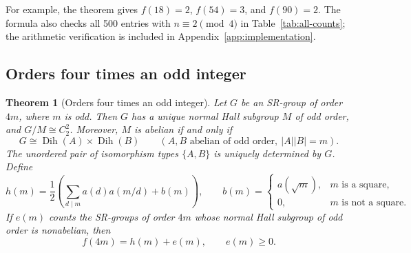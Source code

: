 \documentclass[11pt,a4paper]{amsart}
\newtheorem{thm}{Theorem}[section]
\theoremstyle{definition}
\theoremstyle{remark}
\numberwithin{equation}{section}
\begin{document}
For example, the theorem gives $f(18)=2$, $f(54)=3$, and $f(90)=2$.
The formula also checks all 500 entries with $n\equiv2\pmod4$
in Table~\ref{tab:all-counts}; the arithmetic verification is included
in Appendix~\ref{app:implementation}.

\subsection{Orders four times an odd integer}
\begin{thm}[Orders four times an odd integer]\label{thm:four-odd}
Let $G$ be an SR-group of order $4m$, where $m$ is odd. Then $G$ has a
unique normal Hall subgroup $M$ of odd order, and $G/M\cong C_2^2$.
Moreover, $M$ is abelian if and only if
\[
 G\cong\operatorname{Dih}(A)\times\operatorname{Dih}(B)
 \qquad (A,B\text{ abelian of odd order},\ |A||B|=m).
\]
The unordered pair of isomorphism types $\{A,B\}$ is uniquely determined
by $G$. Define
\begin{equation}\label{eq:four-odd-baseline}
 h(m)=\frac12\left(\sum_{d\mid m}a(d)a(m/d)+b(m)\right),\qquad
 b(m)=\begin{cases}
 a(\sqrt m),&m\text{ is a square},\\
 0,&m\text{ is not a square}.
 \end{cases}
\end{equation}
If $e(m)$ counts the SR-groups of order $4m$ whose normal Hall subgroup
of odd order is nonabelian, then
\begin{equation}\label{eq:four-odd-structural}
 f(4m)=h(m)+e(m),\qquad e(m)\ge0.
\end{equation}
\end{thm}
\end{document}
